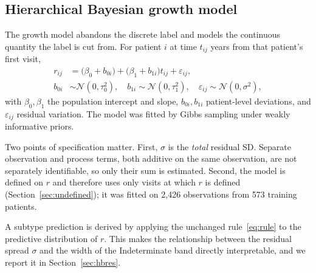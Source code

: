 \documentclass[11pt]{article}
\begin{document}
\subsection{Hierarchical Bayesian growth model}
\label{sec:hb}
The growth model abandons the discrete label and models the continuous quantity
the label is cut from. For patient $i$ at time $t_{ij}$ years from that
patient's first visit,
\begin{align}
r_{ij} &= \bigl(\beta_0 + b_{0i}\bigr) + \bigl(\beta_1 + b_{1i}\bigr) t_{ij} + \varepsilon_{ij},
\label{eq:hb}\\[2pt]
b_{0i} &\sim \mathcal{N}(0, \tau_0^2), \quad
b_{1i} \sim \mathcal{N}(0, \tau_1^2), \quad
\varepsilon_{ij} \sim \mathcal{N}(0, \sigma^2),
\nonumber
\end{align}
with $\beta_0, \beta_1$ the population intercept and slope, $b_{0i}, b_{1i}$
patient-level deviations, and $\varepsilon_{ij}$ residual variation. The model
was fitted by Gibbs sampling under weakly informative priors.

Two points of specification matter. First, $\sigma$ is the \emph{total} residual
SD. Separate observation and process terms, both additive on the same
observation, are not separately identifiable, so only their sum is estimated.
Second, the model is defined on $r$ and therefore uses only visits at which $r$
is defined (Section~\ref{sec:undefined}); it was fitted on 2,426 observations
from 573 training patients.

A subtype prediction is derived by applying the unchanged
rule~\eqref{eq:rule} to the predictive distribution of $r$. This makes the
relationship between the residual spread $\sigma$ and the width of the
Indeterminate band directly interpretable, and we report it in
Section~\ref{sec:hbres}.
\end{document}
